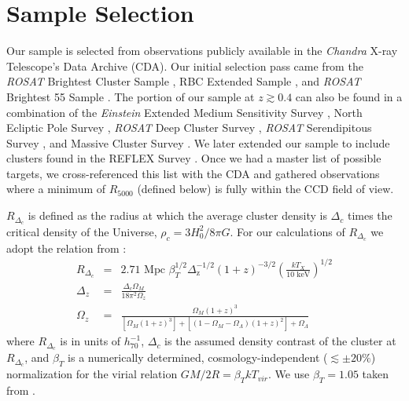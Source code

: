 \documentclass{emulateapj}
\begin{document}
\section{Sample Selection} \label{sec:selection}

Our sample is selected from observations publicly available in the
{\it Chandra} X-ray Telescope's Data Archive (CDA). Our initial
selection pass came from the {\textit{ROSAT}} Brightest Cluster Sample
\citep{1998MNRAS.301..881E}, RBC Extended Sample
\citep{2000MNRAS.318..333E}, and {\textit{ROSAT}} Brightest 55 Sample
\citep{1990MNRAS.245..559E, 1998MNRAS.298..416P}. The portion of our
sample at $z \gtrsim 0.4$ can also be found in a combination of the
{\textit{Einstein}} Extended Medium Sensitivity Survey
\citep{1990ApJS...72..567G}, North Ecliptic Pole Survey
\citep{2006ApJS..162..304H}, {\textit{ROSAT}} Deep Cluster Survey
\citep{1995ApJ...445L..11R}, {\textit{ROSAT}} Serendipitous Survey
\citep{1998ApJ...502..558V}, and Massive Cluster Survey
\citep{2001ApJ...553..668E}. We later extended our sample to include
clusters found in the REFLEX Survey \citep{2004A&A...425..367B}. Once
we had a master list of possible targets, we cross-referenced this
list with the CDA and gathered observations where a minimum of
$R_{5000}$ (defined below) is fully within the CCD field of
view.

$R_{\Delta_c}$ is defined as the radius at which the average cluster
density is $\Delta_c$ times the critical density of the Universe,
$\rho_c=3H_{0}^2/8\pi G$. For our calculations of $R_{\Delta_c}$ we
adopt the relation from \cite{2002A&A...389....1A}:
\begin{eqnarray}
R_{\Delta_c} &=& 2.71 \text{ Mpc }
\beta_T^{1/2}
\Delta_{\text{z}}^{-1/2}
(1+z)^{-3/2}
\left(\frac{kT_X}{10 \text{ keV}}\right)^{1/2}\\
\Delta_z &=& \frac{\Delta_c \Omega_M}{18\pi^2\Omega_z} \nonumber \\
\Omega_z &=& \frac{\Omega_M (1+z)^3}{[\Omega_M
(1+z)^3]+[(1-\Omega_M-\Omega_{\Lambda})(1+z)^2]+\Omega_{\Lambda}} \nonumber
\end{eqnarray}
where $R_{\Delta_c}$ is in units of $h_{70}^{-1}$, $\Delta_c$ is
the assumed density contrast of the cluster at $R_{\Delta_c}$, and
$\beta_T$ is a numerically determined, cosmology-independent
($\lesssim \pm 20\%$) normalization for the virial relation $GM/2R =
\beta_TkT_{vir}$. We use $\beta_T = 1.05$ taken from
\cite{1996ApJ...469..494E}.
\end{document}
